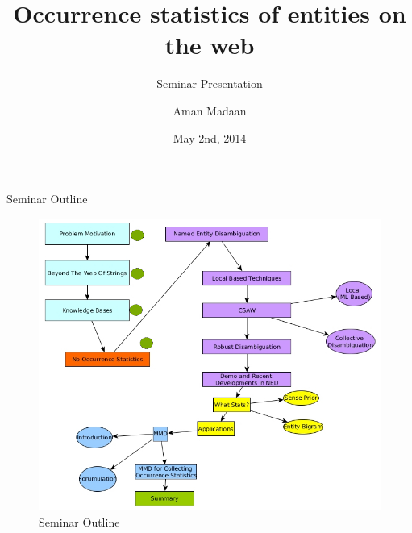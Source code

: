 \documentclass{beamer}
\title{Occurrence statistics of entities on the web}
\subtitle{Seminar Presentation}
\author[Aman Madaan]{Aman Madaan}
\institute[IITB]{
  Indian Institute of Technology Bombay, Mumbai
}
\date{May 2nd, 2014}
\begin{document}
\maketitle



\begin{frame}{Seminar Outline}
 \begin{center}
 \begin{figure}[h]
 
 \includegraphics[bb=0 0 937 610, scale=0.35]{./mark1.jpg}
 \caption{Seminar Outline}
\end{figure}
\end{center}
\end{frame}





\end{document}
